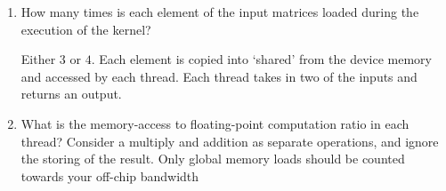 \documentclass[12pt]{article}
\begin{document}
\begin{enumerate}

\item How many times is each element of the input matrices loaded during the execution of the kernel?

\subitem Either $3$ or $4$. Each element is copied into `shared' from the device memory and accessed by each thread. Each thread takes in two of the inputs and returns an output. 

\item What is the memory-access to floating-point computation ratio in each thread?  Consider a multiply and addition as separate operations, and ignore the storing of the result.  Only global memory loads should be counted towards your off-chip bandwidth

\subitem 

\end{enumerate}
\end{document}
